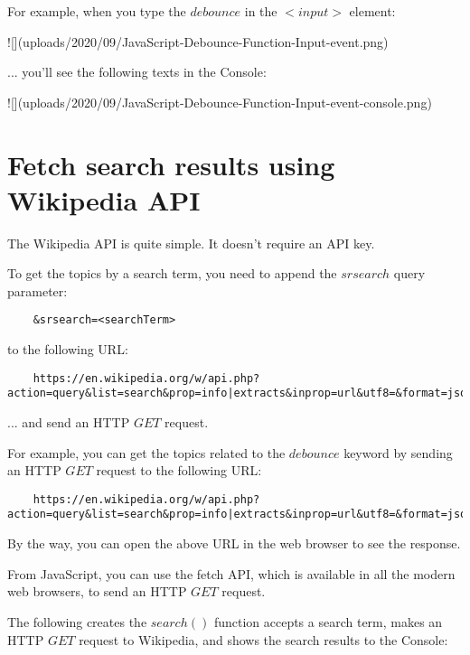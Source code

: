 \documentclass[11pt]{article}
\begin{document}
\noindent
For example, when you type the $debounce$ in the $<input>$ element:

![](uploads/2020/09/JavaScript-Debounce-Function-Input-event.png)

\noindent
... you'll see the following texts in the Console:

![](uploads/2020/09/JavaScript-Debounce-Function-Input-event-console.png)

\section*{Fetch search results using Wikipedia API}

The Wikipedia API is quite simple. It doesn't require an API key.
\newline

\noindent
To get the topics by a search term, you need to append the $srsearch$
query parameter:

\begin{lstlisting}
    &srsearch=<searchTerm>
\end{lstlisting}

\noindent
to the following URL:

\begin{lstlisting}
    https://en.wikipedia.org/w/api.php?action=query&list=search&prop=info|extracts&inprop=url&utf8=&format=json&origin=*&srlimit=10
\end{lstlisting}

\noindent
... and send an HTTP $GET$ request.
\newline

\noindent
For example, you can get the topics related to the $debounce$ keyword by
sending an HTTP $GET$ request to the following URL:

\begin{lstlisting}
    https://en.wikipedia.org/w/api.php?action=query&list=search&prop=info|extracts&inprop=url&utf8=&format=json&origin=*&srlimit=10&srsearch=debounce
\end{lstlisting}

\noindent
By the way, you can open the above URL in the web browser to see the response.
\newline

\noindent
From JavaScript, you can use the fetch API, which is available in all
the modern web browsers, to send an HTTP $GET$ request.
\newline

\noindent
The following creates the $search()$ function accepts a search term,
makes an HTTP $GET$ request to Wikipedia, and shows the search results
to the Console:
\end{document}
